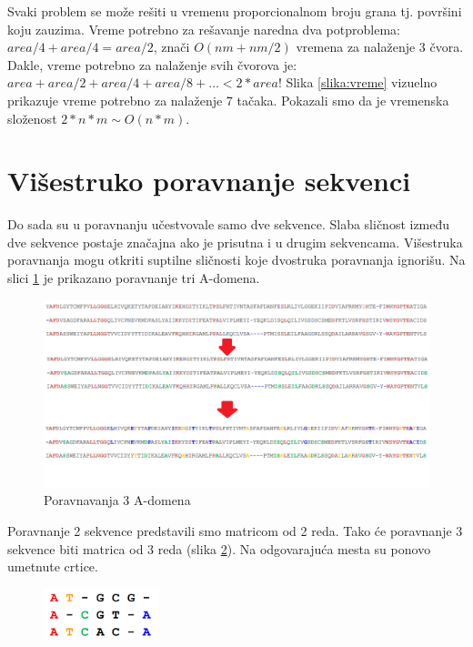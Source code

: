 Svaki problem se može rešiti u vremenu proporcionalnom broju grana tj. površini koju zauzima. Vreme potrebno za rešavanje naredna dva potproblema: $area/4 + area/4 = area/2$, znači  $O(nm + nm/2)$ vremena za nalaženje 3 čvora. Dakle, vreme potrebno za nalaženje svih čvorova je: $area + area/2 + area/4 + area/8 + \dots < 2 * area$! Slika \ref{slika:vreme} vizuelno prikazuje vreme potrebno za nalaženje 7 tačaka. Pokazali smo da je vremenska složenost $2*n*m \sim O(n*m)$.

\section{Višestruko poravnanje sekvenci}

Do sada su u poravnanju učestvovale samo dve sekvence. Slaba sličnost između dve sekvence postaje značajna ako je prisutna i u drugim sekvencama. Višestruka poravnanja mogu otkriti suptilne sličnosti koje dvostruka poravnanja ignorišu. Na slici \ref{slika:poravnavanjaTriA} je prikazano poravnanje tri A-domena.


\begin{figure}[h!]
\centering
\includegraphics[width=\textwidth]{poglavlja/5/slike/poravnavanjaTriAdomena.png}
\caption{Poravnavanja 3 A-domena}
\label{slika:poravnavanjaTriA}
\end{figure}


Poravnanje 2 sekvence predstavili smo matricom od 2 reda. Tako će poravnanje 3 sekvence biti matrica od 3 reda (slika  \ref{slika:poravnavanjeMatrica}). Na odgovarajuća mesta su ponovo umetnute crtice.

    \begin{figure}[h!]
    \centering
    \includegraphics[width=0.3\textwidth]{poglavlja/5/slike/poravnanjeMatrica.png}
    \caption{}
    \label{slika:poravnavanjeMatrica}
    \end{figure}

